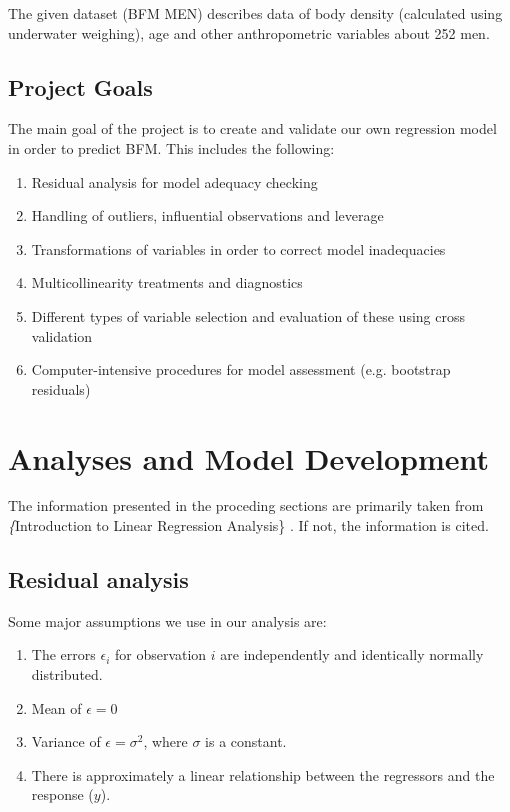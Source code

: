 \documentclass[11pt]{article}
\begin{document}
The given dataset (BFM MEN) describes data of body density (calculated using underwater weighing), 
age and other anthropometric variables about 252 men.

\subsection{Project Goals}
\label{sec:orgf2fa6c1}

The main goal of the project is to create and validate our own regression model in order to predict BFM.
This includes the following:

\begin{enumerate}
\item Residual analysis for model adequacy checking
\item Handling of outliers, influential observations and leverage
\item Transformations of variables in order to correct model inadequacies
\item Multicollinearity treatments and diagnostics
\item Different types of variable selection and evaluation of these using cross validation
\item Computer-intensive procedures for model assessment (e.g. bootstrap residuals)
\end{enumerate}

\newpage
\section{Analyses and Model Development}
\label{sec:org01a46d8}

The information presented in the proceding sections are primarily taken from \textit\{Introduction to
Linear Regression Analysis\} \cite{Montgomery2012}. If not, the information is cited.

\subsection{Residual analysis}
\label{sec:org0cab385}

Some major assumptions we use in our analysis are:

\begin{enumerate}
\item The errors \(\epsilon_i\) for observation \(i\) are independently and identically normally distributed.
\item Mean of \(\epsilon = 0\)
\item Variance of \(\epsilon = \sigma^2\), where \(\sigma\) is a constant.
\item There is approximately a linear relationship between the regressors and the response (\(y\)).
\end{enumerate}
\end{document}

